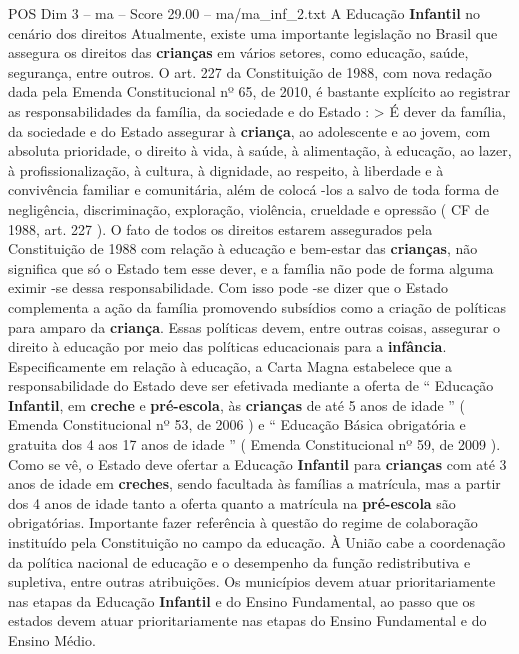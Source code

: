 \begin{textsample}{POS Dim 3 – ma – Score 29.00 – ma/ma\_inf\_2.txt}  \label{ex:f3_pos_141}
A Educação \textbf{Infantil} no cenário dos direitos Atualmente, existe uma importante legislação no Brasil que assegura os direitos das \textbf{crianças} em vários setores, como educação, saúde, segurança, entre outros.
O art. 227 da Constituição de 1988, com nova redação dada pela Emenda Constitucional nº 65, de 2010, é bastante explícito ao registrar as responsabilidades da família, da sociedade e do Estado : > É dever da família, da sociedade e do Estado assegurar à \textbf{criança}, ao adolescente e ao jovem, com absoluta prioridade, o direito à vida, à saúde, à alimentação, à educação, ao lazer, à profissionalização, à cultura, à dignidade, ao respeito, à liberdade e à convivência familiar e comunitária, além de colocá -los a salvo de toda forma de negligência, discriminação, exploração, violência, crueldade e opressão ( CF de 1988, art. 227 ).
O fato de todos os direitos estarem assegurados pela Constituição de 1988 com relação à educação e bem-estar das \textbf{crianças}, não significa que só o Estado tem esse dever, e a família não pode de forma alguma eximir -se dessa responsabilidade.
Com isso pode -se dizer que o Estado complementa a ação da família promovendo subsídios como a criação de políticas para amparo da \textbf{criança}.
Essas políticas devem, entre outras coisas, assegurar o direito à educação por meio das políticas educacionais para a \textbf{infância}.
Especificamente em relação à educação, a Carta Magna estabelece que a responsabilidade do Estado deve ser efetivada mediante a oferta de “ Educação \textbf{Infantil}, em \textbf{creche} e \textbf{pré-escola}, às \textbf{crianças} de até 5 anos de idade ” ( Emenda Constitucional nº 53, de 2006 ) e “ Educação Básica obrigatória e gratuita dos 4 aos 17 anos de idade ” ( Emenda Constitucional nº 59, de 2009 ).
Como se vê, o Estado deve ofertar a Educação \textbf{Infantil} para \textbf{crianças} com até 3 anos de idade em \textbf{creches}, sendo facultada às famílias a matrícula, mas a partir dos 4 anos de idade tanto a oferta quanto a matrícula na \textbf{pré-escola} são obrigatórias.
Importante fazer referência à questão do regime de colaboração instituído pela Constituição no campo da educação.
À União cabe a coordenação da política nacional de educação e o desempenho da função redistributiva e supletiva, entre outras atribuições.
Os municípios devem atuar prioritariamente nas etapas da Educação \textbf{Infantil} e do Ensino Fundamental, ao passo que os estados devem atuar prioritariamente nas etapas do Ensino Fundamental e do Ensino Médio.

\end{textsample}
